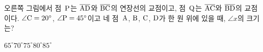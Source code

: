 \noindent\begin{minipage}[t]{0.58\linewidth}\vspace{0pt}\raggedright 오른쪽 그림에서 점~$\mathrm{P}$는 $\overline{\mathrm{AD}}$와 $\overline{\mathrm{BC}}$의 연장선의 교점이고, 점~$\mathrm{Q}$는 $\overline{\mathrm{AC}}$와 $\overline{\mathrm{BD}}$의 교점이다. $\angle\mathrm{C}=20^\circ$, $\angle\mathrm{P}=45^\circ$이고 네 점~$\mathrm{A}$, $\mathrm{B}$, $\mathrm{C}$, $\mathrm{D}$가 한 원 위에 있을 때, $\angle x$의 크기는?\end{minipage}\hfill\begin{minipage}[t]{0.4\linewidth}\vspace{0pt}\centering \resizebox{\ifdim\width>\linewidth\linewidth\else\width\fi}{!}{}\end{minipage}\par
\begin{choices32}{$65^\circ$}{$70^\circ$}{$75^\circ$}{$80^\circ$}{$85^\circ$}\end{choices32}
